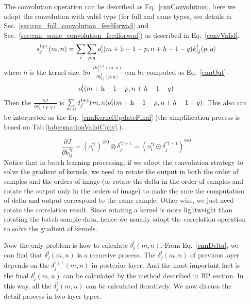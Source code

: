 \documentclass[runningheads,openany]{xhlPaper}
\begin{document}
The convolution operation can be described as Eq.~\ref{cnnConvolution}, here we adopt the convolution with valid type (for full and same types, see details in Sec.~\ref{sec:cnn_full_convolution_feedforwad} and Sec.~\ref{sec:cnn_same_convolution_feedforwad}) as described in Eq.~\ref{convValid}.
\begin{equation}
\label{cnnConvolution}
s_j^{l + 1}(m,n) = \sum\limits_i {\sum\limits_{p,q} {o_i^l(m + {\rm{h}} - 1 - p,n + h - 1 - q)k_{ij}^l(p,q)} }
\end{equation}
where $h$ is the kernel size. So $\frac{{\partial s_j^{l + 1}(m,n)}}{{\partial k_{ij}^{l}(p,q)}}$ can be computed as Eq.~\ref{cnnOut}.
\begin{equation}
\label{cnnOut}
o_i^l(m + {\rm{h}} - 1 - p,n + h - 1 - q)
\end{equation}
Then the $\frac{{\partial J}}{{\partial k_{ij}^l(p,q)}}$ is $\sum\limits_{m,n} {\delta _j^{l + 1}(m,n)o_i^l(m + {\rm{h}} - 1 - p,n + h - 1 - q)}$. This also can be interpreted as the Eq.~\ref{cnnKernelUpdateFinal} (the simplification process is based on Tab.\ref{tab:euqationValidConv}.).

\begin{equation}
\label{cnnKernelUpdateFinal}
\frac{{\partial J}}{{\partial k_{ij}^{*l}}} = {\left( {o_i^{*l}} \right)^{180}} \otimes \delta _j^{*l + 1} = {\left( {o_i^{*l} \odot \delta _j^{*l + 1}} \right)^{180}}
\end{equation}
Notice that in batch learning processing, if we adopt the convolution strategy to solve the gradient of kernels, we need to rotate the output in both the order of samples and the orders of image (or rotate the delta in the order of samples and rotate the output only in the orders of image) to make the sure the computation of delta and output correspond to the same sample.
Other wise, we just need rotate the correlation result. Since rotating a kernel is more lightweight than rotating the batch sample data, hence we usually adopt the correlation operation to solve the gradient of kernels.

Now the only problem is how to calculate $\delta _j^{l}(m,n)$. From Eq.~\ref{cnnDelta}, we can find that $\delta _j^{l}(m,n)$ is a recursive process. The $\delta _j^{l}(m,n)$ of previous layer depends on the $\delta _j^{l + 1}(m,n)$ in posterior layer. And the most important fact is the final $\delta _j^{l}(m,n)$ can be calculated by the method described in BP section. In this way, all the $\delta _j^{l}(m,n)$ can be calculated iteratively. We now discuss the detail process in two layer types.
\end{document}

